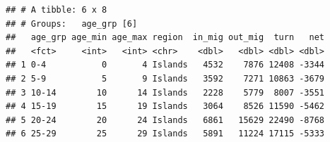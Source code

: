 \documentclass[
]{book}
\newenvironment{Shaded}{\begin{snugshade}}{\end{snugshade}}
\newcommand{\AttributeTok}[1]{\textcolor[rgb]{0.77,0.63,0.00}{#1}}
\newcommand{\ConstantTok}[1]{\textcolor[rgb]{0.00,0.00,0.00}{#1}}
\newcommand{\DecValTok}[1]{\textcolor[rgb]{0.00,0.00,0.81}{#1}}
\newcommand{\FunctionTok}[1]{\textcolor[rgb]{0.00,0.00,0.00}{#1}}
\newcommand{\NormalTok}[1]{#1}
\newcommand{\OtherTok}[1]{\textcolor[rgb]{0.56,0.35,0.01}{#1}}
\newcommand{\SpecialCharTok}[1]{\textcolor[rgb]{0.00,0.00,0.00}{#1}}
\newcommand{\StringTok}[1]{\textcolor[rgb]{0.31,0.60,0.02}{#1}}
\begin{document}
\begin{verbatim}
## # A tibble: 6 x 8
## # Groups:   age_grp [6]
##   age_grp age_min age_max region  in_mig out_mig  turn   net
##   <fct>     <int>   <int> <chr>    <dbl>   <dbl> <dbl> <dbl>
## 1 0-4           0       4 Islands   4532    7876 12408 -3344
## 2 5-9           5       9 Islands   3592    7271 10863 -3679
## 3 10-14        10      14 Islands   2228    5779  8007 -3551
## 4 15-19        15      19 Islands   3064    8526 11590 -5462
## 5 20-24        20      24 Islands   6861   15629 22490 -8768
## 6 25-29        25      29 Islands   5891   11224 17115 -5333
\end{verbatim}

\begin{Shaded}
\end{Shaded}
\end{document}
